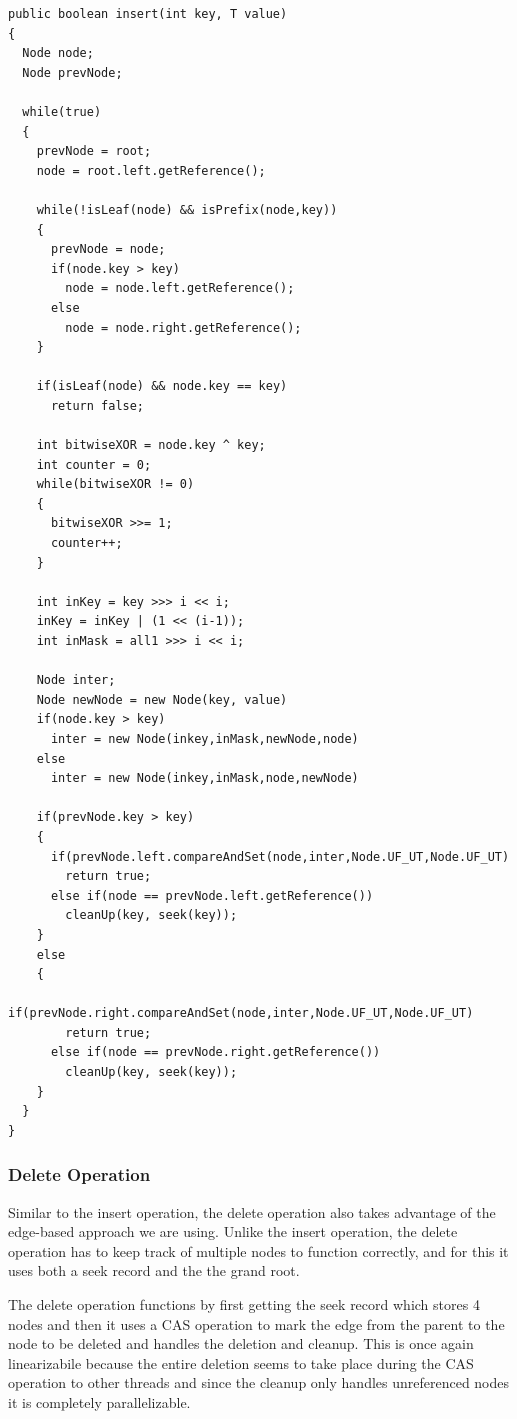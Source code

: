 \documentclass[conference]{IEEEtran}
\begin{document}
\begin{lstlisting}[frame=lines]
public boolean insert(int key, T value)
{
  Node node;
  Node prevNode;

  while(true)
  {
    prevNode = root;
    node = root.left.getReference();
      
    while(!isLeaf(node) && isPrefix(node,key))
    {
      prevNode = node;
      if(node.key > key)
        node = node.left.getReference();
      else
        node = node.right.getReference();
    }

    if(isLeaf(node) && node.key == key)
      return false;

    int bitwiseXOR = node.key ^ key;
    int counter = 0;
    while(bitwiseXOR != 0)
    {
      bitwiseXOR >>= 1;
      counter++;
    }

    int inKey = key >>> i << i;
    inKey = inKey | (1 << (i-1));
    int inMask = all1 >>> i << i;

    Node inter;
    Node newNode = new Node(key, value)
    if(node.key > key)
      inter = new Node(inkey,inMask,newNode,node)
    else
      inter = new Node(inkey,inMask,node,newNode)

    if(prevNode.key > key)
    {
      if(prevNode.left.compareAndSet(node,inter,Node.UF_UT,Node.UF_UT)
        return true;   
      else if(node == prevNode.left.getReference())
        cleanUp(key, seek(key));
    }
    else
    {
      if(prevNode.right.compareAndSet(node,inter,Node.UF_UT,Node.UF_UT)
        return true;   
      else if(node == prevNode.right.getReference())
        cleanUp(key, seek(key));
    }
  }
}
\end{lstlisting}

\subsubsection{Delete Operation}
Similar to the insert operation, the delete operation also takes advantage of the edge-based approach we are using. Unlike the insert operation, the delete operation has to keep track of multiple nodes to function correctly, and for this it uses both a seek record and the the grand root.
\par
The delete operation functions by first getting the seek record which stores 4 nodes and then it uses a CAS operation to mark the edge from the parent to the node to be deleted and handles the deletion and cleanup. This is once again linearizabile because the entire deletion seems to take place during the CAS operation to other threads and since the cleanup only handles unreferenced nodes it is completely parallelizable.
\end{document}
